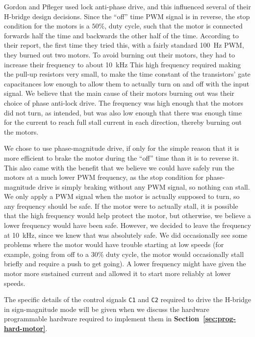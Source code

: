 \documentclass[letterpaper, 11pt]{article}
\newcommand*{\secref}[1]{\textbf{Section~\ref{#1}}}
\begin{document}
\begin{enumerate}[label=\textbf{\arabic*.}]
Gordon and Pfleger used lock anti-phase drive, and this influenced several of their H-bridge design decisions. Since the ``off'' time PWM signal is in reverse, the stop condition for the motors is a $50\%$, duty cycle, such that the motor is connected forwards half the time and backwards the other half of the time. According to their report, the first time they tried this, with a fairly standard \SI{100}{\hertz} PWM, they burned out two motors. To avoid burning out their motors, they had to increase their frequency to about \SI{10}{\kilo\hertz} This high frequency required making the pull-up resistors very small, to make the time constant of the transistors' gate capacitances low enough to allow them to actually turn on and off with the input signal. We believe that the main cause of their motors burning out was their choice of phase anti-lock drive. The frequency was high enough that the motors did not turn, as intended, but was also low enough that there was enough time for the current to reach full stall current in each direction, thereby burning out the motors.

We chose to use phase-magnitude drive, if only for the simple reason that it is more efficient to brake the motor during the ``off'' time than it is to reverse it. This also came with the benefit that we believe we could have safely run the motors at a much lower PWM frequency, as the stop condition for phase-magnitude drive is simply braking without any PWM signal, so nothing can stall. We only apply a PWM signal when the motor is actually supposed to turn, so any frequency should be safe. If the motor were to actually stall, it is possible that the high frequency would help protect the motor, but otherwise, we believe a lower frequency would have been safe. However, we decided to leave the frequency at \SI{10}{\kilo\hertz}, since we knew that was absolutely safe. We did occasionally see some problems where the motor would have trouble starting at low speeds (for example, going from off to a $30\%$ duty cycle, the motor would occasionally stall briefly and require a push to get going). A lower frequency might have given the motor more sustained current and allowed it to start more reliably at lower speeds.

The specific details of the control signals \texttt{C1} and \texttt{C2} required to drive the H-bridge in sign-magnitude mode will be given when we discuss the hardware programmable hardware required to implement them in \secref{sec:prog-hard-motor}.


\end{enumerate}
\end{document}
